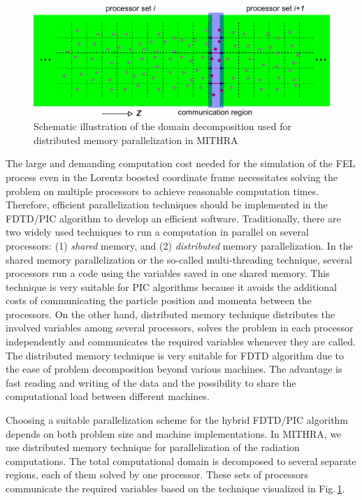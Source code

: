 \begin{figure}
	\centering
	\includegraphics[width=5.0in]{./MITHRA_FDTDPIC/Fig5/Fig5.pdf}
	\caption{Schematic illustration of the domain decomposition used for distributed memory parallelization in MITHRA}
	\label{FDTDPICFig5}
\end{figure}
%
The large and demanding computation cost needed for the simulation of the FEL process even in the Lorentz boosted coordinate frame necessitates solving the problem on multiple processors to achieve reasonable computation times.
%
Therefore, efficient parallelization techniques should be implemented in the FDTD/PIC algorithm to develop an efficient software.
%
Traditionally, there are two widely used techniques to run a computation in parallel on several processors: (1) \textit{shared} memory, and (2) \textit{distributed} memory parallelization.
%
In the shared memory parallelization or the so-called multi-threading technique, several processors run a code using the variables saved in one shared memory.
%
This technique is very suitable for PIC algorithms because it avoids the additional costs of communicating the particle position and momenta between the processors.
%
On the other hand, distributed memory technique distributes the involved variables among several processors, solves the problem in each processor independently and communicates the required variables whenever they are called.
%
The distributed memory technique is very suitable for FDTD algorithm due to the ease of problem decomposition beyond various machines.
%
The advantage is fast reading and writing of the data and the possibility to share the computational load between different machines.

Choosing a suitable parallelization scheme for the hybrid FDTD/PIC algorithm depends on both problem size and machine implementations.
%
In MITHRA, we use distributed memory technique for parallelization of the radiation computations.
%
The total computational domain is decomposed to several separate regions, each of them solved by one processor.
%
These sets of processors communicate the required variables based on the technique visualized in Fig.\,\ref{FDTDPICFig5}.

